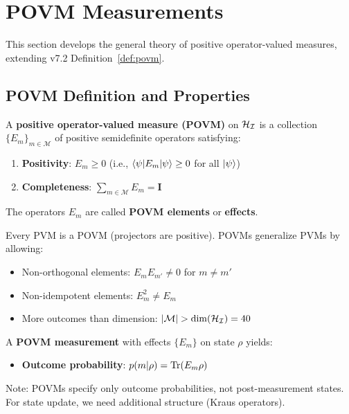 \section{POVM Measurements}
\label{sec:povm-measurements}

This section develops the general theory of positive operator-valued measures, extending v7.2 Definition~\ref{def:povm}.

\subsection{POVM Definition and Properties}

\begin{definition}
\label{def:povm-v73}
A \textbf{positive operator-valued measure (POVM)} on $\mathcal{H}_{\mathcal{I}}$ is a collection $\{E_m\}_{m \in \mathcal{M}}$ of positive semidefinite operators satisfying:
\begin{enumerate}
  \item \textbf{Positivity}: $E_m \geq 0$ (i.e., $\langle \psi|E_m|\psi\rangle \geq 0$ for all $|\psi\rangle$)
  \item \textbf{Completeness}: $\sum_{m \in \mathcal{M}} E_m = \mathbf{I}$
\end{enumerate}
The operators $E_m$ are called \textbf{POVM elements} or \textbf{effects}.
\end{definition}

\begin{remark}
\label{rem:pvm-povm}
Every PVM is a POVM (projectors are positive). POVMs generalize PVMs by allowing:
\begin{itemize}
  \item Non-orthogonal elements: $E_m E_{m'} \neq 0$ for $m \neq m'$
  \item Non-idempotent elements: $E_m^2 \neq E_m$
  \item More outcomes than dimension: $|\mathcal{M}| > \dim(\mathcal{H}_{\mathcal{I}}) = 40$
\end{itemize}
\end{remark}

\begin{definition}
\label{def:povm-measurement}
A \textbf{POVM measurement} with effects $\{E_m\}$ on state $\rho$ yields:
\begin{itemize}
  \item \textbf{Outcome probability}: $p(m|\rho) = \mathrm{Tr}(E_m \rho)$
\end{itemize}
Note: POVMs specify only outcome probabilities, not post-measurement states. For state update, we need additional structure (Kraus operators).
\end{definition}

